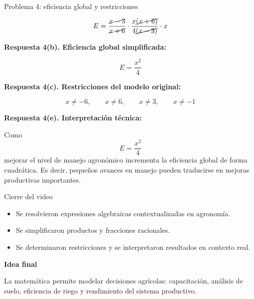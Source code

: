 \documentclass{beamer}
\begin{document}
	\begin{frame}{Problema 4: eficiencia global y restricciones}
		
		\[
		E=\frac{\cancel{x-3}}{\cancel{x+6}}\cdot \frac{x\cancel{(x+6)}}{4\cancel{(x-3)}}\cdot x
		\]
		
		\textbf{Respuesta 4(b). Eficiencia global simplificada:}
		
		\[
		E=\frac{x^2}{4}
		\]
		
		\textbf{Respuesta 4(c). Restricciones del modelo original:}
		
		\[
		x\neq -6,\qquad x\neq 6,\qquad x\neq 3,\qquad x\neq -1
		\]
		
		\textbf{Respuesta 4(e). Interpretación técnica:}
		
		Como
		\[
		E=\frac{x^2}{4}
		\]
		mejorar el nivel de manejo agronómico incrementa la eficiencia global de forma cuadrática. Es decir, pequeños avances en manejo pueden traducirse en mejoras productivas importantes.
	\end{frame}
	
	\begin{frame}{Cierre del video}
		\begin{itemize}
			\item Se resolvieron expresiones algebraicas contextualizadas en agronomía.
			\item Se simplificaron productos y fracciones racionales.
			\item Se determinaron restricciones y se interpretaron resultados en contexto real.
		\end{itemize}
		
		\textbf{Idea final}
		
		La matemática permite modelar decisiones agrícolas: capacitación, análisis de suelo, eficiencia de riego y rendimiento del sistema productivo.
	\end{frame}
	
\end{document}
